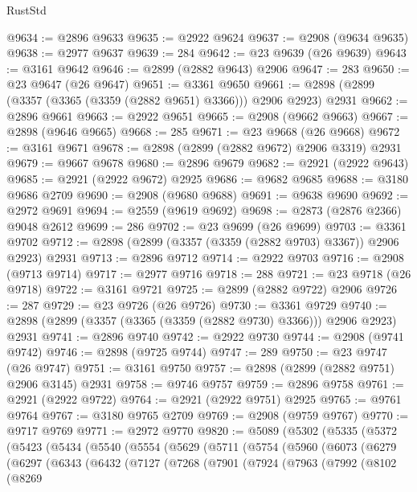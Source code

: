 \begin{lexlean}{RustStd}
\begin{coremodule}
@9634 := @2896 @9633
@9635 := @2922 @9624
@9637 := @2908 (@9634 @9635)
@9638 := @2977 @9637
@9639 := 284
@9642 := @23 @9639 (@26 @9639)
@9643 := @3161 @9642
@9646 := @2899 (@2882 @9643) @2906
@9647 := 283
@9650 := @23 @9647 (@26 @9647)
@9651 := @3361 @9650
@9661 := @2898 (@2899 (@3357 (@3365 (@3359 (@2882 @9651) @3366))) @2906 @2923) @2931
@9662 := @2896 @9661
@9663 := @2922 @9651
@9665 := @2908 (@9662 @9663)
@9667 := @2898 (@9646 @9665)
@9668 := 285
@9671 := @23 @9668 (@26 @9668)
@9672 := @3161 @9671
@9678 := @2898 (@2899 (@2882 @9672) @2906 @3319) @2931
@9679 := @9667 @9678
@9680 := @2896 @9679
@9682 := @2921 (@2922 @9643)
@9685 := @2921 (@2922 @9672) @2925
@9686 := @9682 @9685
@9688 := @3180 @9686 @2709
@9690 := @2908 (@9680 @9688)
@9691 := @9638 @9690
@9692 := @2972 @9691
@9694 := @2559 (@9619 @9692)
@9698 := @2873 (@2876 @2366) @9048 @2612
@9699 := 286
@9702 := @23 @9699 (@26 @9699)
@9703 := @3361 @9702
@9712 := @2898 (@2899 (@3357 (@3359 (@2882 @9703) @3367)) @2906 @2923) @2931
@9713 := @2896 @9712
@9714 := @2922 @9703
@9716 := @2908 (@9713 @9714)
@9717 := @2977 @9716
@9718 := 288
@9721 := @23 @9718 (@26 @9718)
@9722 := @3161 @9721
@9725 := @2899 (@2882 @9722) @2906
@9726 := 287
@9729 := @23 @9726 (@26 @9726)
@9730 := @3361 @9729
@9740 := @2898 (@2899 (@3357 (@3365 (@3359 (@2882 @9730) @3366))) @2906 @2923) @2931
@9741 := @2896 @9740
@9742 := @2922 @9730
@9744 := @2908 (@9741 @9742)
@9746 := @2898 (@9725 @9744)
@9747 := 289
@9750 := @23 @9747 (@26 @9747)
@9751 := @3161 @9750
@9757 := @2898 (@2899 (@2882 @9751) @2906 @3145) @2931
@9758 := @9746 @9757
@9759 := @2896 @9758
@9761 := @2921 (@2922 @9722)
@9764 := @2921 (@2922 @9751) @2925
@9765 := @9761 @9764
@9767 := @3180 @9765 @2709
@9769 := @2908 (@9759 @9767)
@9770 := @9717 @9769
@9771 := @2972 @9770
@9820 := @5089
    (@5302
      (@5335
        (@5372
          (@5423
            (@5434
              (@5540
                (@5554
                  (@5629
                    (@5711
                      (@5754
                        (@5960
                          (@6073
                            (@6279
                              (@6297
                                (@6343
                                  (@6432
                                    (@7127
                                      (@7268
                                        (@7901
                                          (@7924
                                            (@7963
                                              (@7992
                                                (@8102
                                                  (@8269

\end{coremodule}
\end{lexlean}
